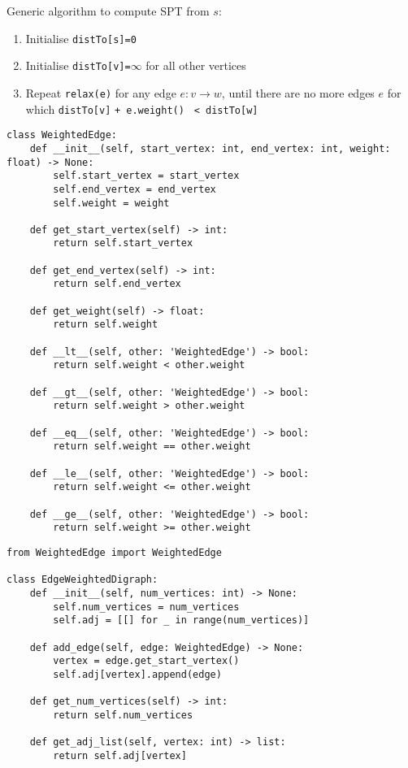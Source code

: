 \documentclass[a4paper]{article}
\begin{document}
Generic algorithm to compute SPT from $s$:
\begin{enumerate}
    \item Initialise \verb|distTo[s]=0|
    \item Initialise \verb|distTo[v]=|$\infty$ for all other vertices
    \item Repeat \verb|relax(e)| for any edge $e:v\to w$, until there are no more edges $e$ for which \verb|distTo[v]| \verb|+ e.weight()| \verb| < distTo[w]|
\end{enumerate}

\begin{lstlisting}
class WeightedEdge:
    def __init__(self, start_vertex: int, end_vertex: int, weight: float) -> None:
        self.start_vertex = start_vertex
        self.end_vertex = end_vertex
        self.weight = weight

    def get_start_vertex(self) -> int:
        return self.start_vertex

    def get_end_vertex(self) -> int:
        return self.end_vertex

    def get_weight(self) -> float:
        return self.weight

    def __lt__(self, other: 'WeightedEdge') -> bool:
        return self.weight < other.weight

    def __gt__(self, other: 'WeightedEdge') -> bool:
        return self.weight > other.weight

    def __eq__(self, other: 'WeightedEdge') -> bool:
        return self.weight == other.weight

    def __le__(self, other: 'WeightedEdge') -> bool:
        return self.weight <= other.weight

    def __ge__(self, other: 'WeightedEdge') -> bool:
        return self.weight >= other.weight
\end{lstlisting}

\begin{lstlisting}
from WeightedEdge import WeightedEdge

class EdgeWeightedDigraph:
    def __init__(self, num_vertices: int) -> None:
        self.num_vertices = num_vertices
        self.adj = [[] for _ in range(num_vertices)]

    def add_edge(self, edge: WeightedEdge) -> None:
        vertex = edge.get_start_vertex()
        self.adj[vertex].append(edge)

    def get_num_vertices(self) -> int:
        return self.num_vertices

    def get_adj_list(self, vertex: int) -> list:
        return self.adj[vertex]
\end{lstlisting}
\end{document}
